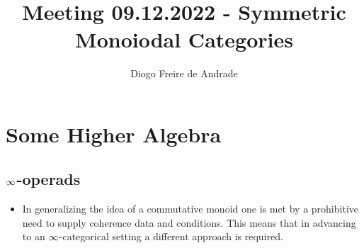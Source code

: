 





\title{Meeting 09.12.2022 - Symmetric Monoiodal Categories}
\author{Diogo Freire de Andrade}


\maketitle
\tableofcontents

\section{Some Higher Algebra}
\subsection{$\operatorname{\infty}$-operads}
\begin{itemize}
\item In generalizing the idea of a commutative monoid one is met by a prohibitive need to supply coherence data and conditions. This means that in advancing to an $\operatorname{\infty}$-categorical setting a different approach is required.
\end{itemize}
